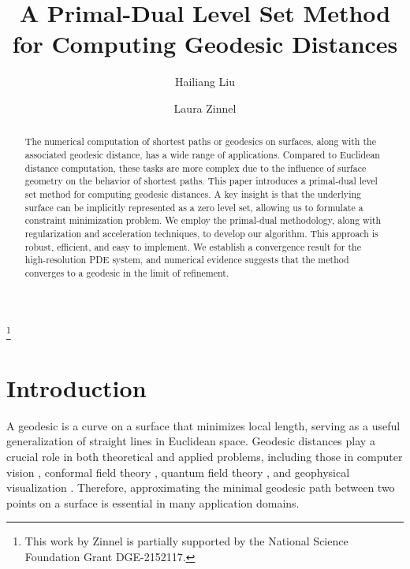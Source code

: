 \documentclass[12pt]{amsart}
\def\blue{\textcolor{blue}}
\newcommand{\Laura}[1]{\textbf{\textcolor{DarkOrchid}{#1}}}
\theoremstyle{definition}
\theoremstyle{remark}
\numberwithin{equation}{section}
\numberwithin{equation}{section}
\begin{document}
\title[Geodesic Distance Approximation] %
{A Primal-Dual Level Set Method for Computing Geodesic Distances}

\author{Hailiang Liu}
\address{$^\dagger$Department of Mathematics, Iowa State University, Ames, IA 50011}

\author{Laura Zinnel}
\address{$^\ddagger$Department of Mathematics, Iowa State University, Ames, IA 50011}

\thanks{ This work by Zinnel is partially supported by the National Science Foundation Grant DGE-2152117.}


\begin{abstract}
    The numerical computation of shortest paths or geodesics on surfaces, along with the associated geodesic distance, has a wide range of applications. Compared to Euclidean distance computation, these tasks are more complex due to the influence of surface geometry on the behavior of shortest paths.  {This paper introduces a primal-dual level set method for computing geodesic distances. A key insight is that the underlying surface can be implicitly represented as a zero level set, allowing us to formulate a constraint minimization problem. We employ the primal-dual methodology, along with   regularization and acceleration techniques, to develop our algorithm. This approach is robust, efficient, and easy to implement. We establish a convergence result for the high-resolution PDE system, and numerical evidence suggests that the method converges to a geodesic in the limit of refinement. }
\end{abstract}

\maketitle

\section{Introduction}
{A geodesic is a curve on a surface that minimizes local length, serving as a useful generalization of straight lines in Euclidean space.
Geodesic distances play a crucial role in both theoretical and applied problems, including those in computer vision \cite{Crane:2020}, conformal field theory \cite{Kastikainen:2022},  quantum field theory \cite{Chapman:2023}, and geophysical visualization \cite{Davis:2019}. Therefore, approximating the minimal geodesic path between two points on a surface is essential in many application domains.}
\end{document}
